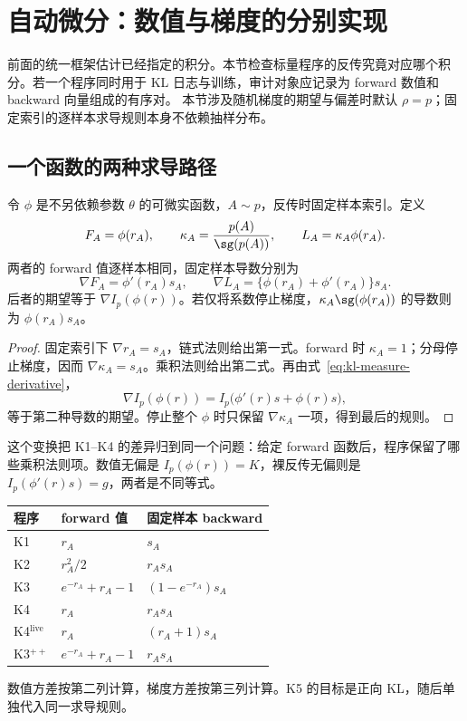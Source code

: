 \section{自动微分：数值与梯度的分别实现}
\label{sec:kl-autodiff}
前面的统一框架估计已经指定的积分。本节检查标量程序的反传究竟对应哪个积分。若一个程序同时用于 KL 日志与训练，审计对象应记录为 forward 数值和 backward 向量组成的有序对。
本节涉及随机梯度的期望与偏差时默认 $\rho=p$；固定索引的逐样本求导规则本身不依赖抽样分布。

\subsection{一个函数的两种求导路径}

\begin{theorem}[固定样本反传与采样测度补偿]
\label{thm:kl-autodiff-transform}
令 $\phi$ 是不另依赖参数 $\theta$ 的可微实函数，$A\sim p$，反传时固定样本索引。定义
\[
 F_A=\phi(r_A),\qquad
 \kappa_A=\frac{p(A)}{\sg(p(A))},\qquad
 L_A=\kappa_A\phi(r_A).
\]
两者的 forward 值逐样本相同，固定样本导数分别为
\[
 \nabla F_A=\phi'(r_A)s_A,\qquad
 \nabla L_A=\{\phi(r_A)+\phi'(r_A)\}s_A.
\]
后者的期望等于 $\nabla I_p(\phi(r))$。若仅将系数停止梯度，$\kappa_A\sg(\phi(r_A))$ 的导数则为 $\phi(r_A)s_A$。
\end{theorem}

\begin{proof}
固定索引下 $\nabla r_A=s_A$，链式法则给出第一式。forward 时 $\kappa_A=1$；分母停止梯度，因而 $\nabla\kappa_A=s_A$。乘积法则给出第二式。再由式~\eqref{eq:kl-measure-derivative}，
\[
 \nabla I_p(\phi(r))
 =I_p\bigl(\phi'(r)s+\phi(r)s\bigr),
\]
等于第二种导数的期望。停止整个 $\phi$ 时只保留 $\nabla\kappa_A$ 一项，得到最后的规则。
\end{proof}

这个变换把 K1--K4 的差异归到同一个问题：给定 forward 函数后，程序保留了哪些乘积法则项。数值无偏是 $I_p(\phi(r))=K$，裸反传无偏则是 $I_p(\phi'(r)s)=g$，两者是不同等式。

\begin{center}
\begin{tabular}{lll}
\toprule
程序 & forward 值 & 固定样本 backward\\
\midrule
K1 & $r_A$ & $s_A$\\
K2 & $r_A^2/2$ & $r_As_A$\\
K3 & $e^{-r_A}+r_A-1$ & $(1-e^{-r_A})s_A$\\
K4 & $r_A$ & $r_As_A$\\
K4$^{\mathrm{live}}$ & $r_A$ & $(r_A+1)s_A$\\
K3$^{++}$ & $e^{-r_A}+r_A-1$ & $r_As_A$\\
\bottomrule
\end{tabular}
\end{center}
数值方差按第二列计算，梯度方差按第三列计算。K5 的目标是正向 KL，随后单独代入同一求导规则。

